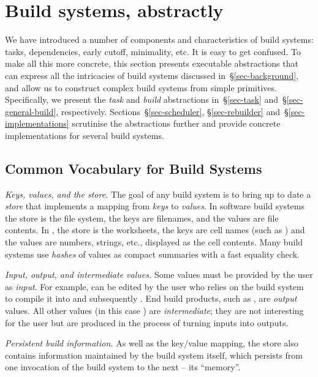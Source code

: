 \section{Build systems, abstractly}\label{sec-abstractions}

We have introduced a number of components and
characteristics of build systems:
tasks, dependencies, early cutoff, minimality, etc.
It is easy to get confused.
To make all this more concrete, this section presents executable
abstractions that can express
all the intricacies of build systems discussed in~\S\ref{sec-background},
and allow us to construct complex build systems from simple primitives. Specifically, we
present the \emph{task} and \emph{build} abstractions in~\S\ref{sec-task}
and~\S\ref{sec-general-build}, respectively. Sections~\S\ref{sec-scheduler},
\S\ref{sec-rebuilder} and~\S\ref{sec-implementations} scrutinise the
abstractions further and provide concrete implementations for several build
systems.

\vspace{-1.5mm}
\subsection{Common Vocabulary for Build Systems}\label{sec-vocabulary}
\vspace{-0.5mm}

\emph{Keys, values, and the store.} The goal of any build system is to
bring up to date a \emph{store} that implements a mapping from \emph{keys} to
\emph{values}. In software build systems the store is the file system, the
keys are filenames, and the values are file contents. In \Excel, the store is
the worksheets, the keys are cell names (such as ) and the values are
numbers, strings, etc., displayed as the cell contents. Many build systems use
\emph{hashes} of values as compact summaries with a fast equality check.

\emph{Input, output, and intermediate values.} Some values must be provided by
the user as \emph{input}. For example,  can be edited by the user
who relies on the build system to compile it into  and subsequently
. End build products, such as , are \emph{output}
values. All other values (in this case ) are \emph{intermediate};
they are not interesting for the user but are produced in the process of turning
inputs into outputs.

\emph{Persistent build information.} As well as the key/value mapping, the
store also contains information maintained by the build system itself, which
persists from one invocation of the build system to the next -- its ``memory''.

